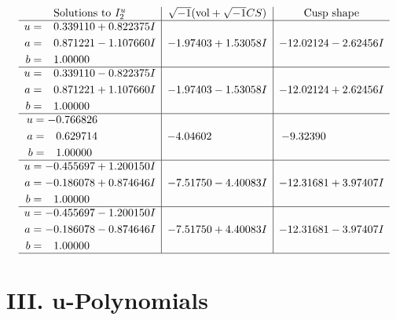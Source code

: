 \documentclass[1p]{elsarticle_modified}
\theoremstyle{definition}
\newcommand{\I}{\sqrt{-1}}
\begin{document}
$$\begin{array}{c|c|c}  
\text{Solutions to }I^u_{2}& \I (\text{vol} + \sqrt{-1}CS) & \text{Cusp shape}\\
 \hline 
\begin{aligned}
u &= \phantom{-}0.339110 + 0.822375 I \\
a &= \phantom{-}0.871221 - 1.107660 I \\
b &= \phantom{-}1.00000\phantom{ +0.000000I}\end{aligned}
 & -1.97403 + 1.53058 I & -12.02124 - 2.62456 I \\ \hline\begin{aligned}
u &= \phantom{-}0.339110 - 0.822375 I \\
a &= \phantom{-}0.871221 + 1.107660 I \\
b &= \phantom{-}1.00000\phantom{ +0.000000I}\end{aligned}
 & -1.97403 - 1.53058 I & -12.02124 + 2.62456 I \\ \hline\begin{aligned}
u &= -0.766826\phantom{ +0.000000I} \\
a &= \phantom{-}0.629714\phantom{ +0.000000I} \\
b &= \phantom{-}1.00000\phantom{ +0.000000I}\end{aligned}
 & -4.04602\phantom{ +0.000000I} & -9.32390\phantom{ +0.000000I} \\ \hline\begin{aligned}
u &= -0.455697 + 1.200150 I \\
a &= -0.186078 + 0.874646 I \\
b &= \phantom{-}1.00000\phantom{ +0.000000I}\end{aligned}
 & -7.51750 - 4.40083 I & -12.31681 + 3.97407 I \\ \hline\begin{aligned}
u &= -0.455697 - 1.200150 I \\
a &= -0.186078 - 0.874646 I \\
b &= \phantom{-}1.00000\phantom{ +0.000000I}\end{aligned}
 & -7.51750 + 4.40083 I & -12.31681 - 3.97407 I\\
 \hline 
 \end{array}$$\newpage
\newpage\renewcommand{\arraystretch}{1}
\centering \section*{ III. u-Polynomials}
\end{document}

